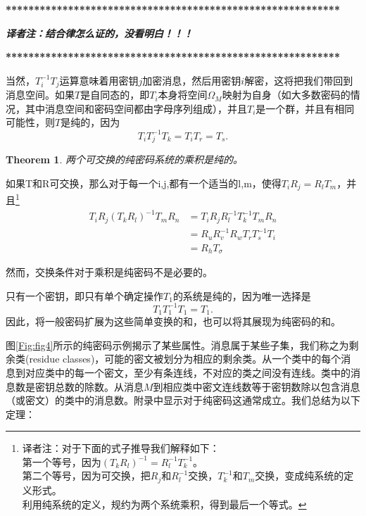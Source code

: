 \documentclass[]{article}
\newtheorem{theorem}{Theorem}
\begin{document}
\vspace{1cm}
\textbf{***********************************************************}\par
\textsl{\textbf{译者注：结合律怎么证的，没看明白！！！}}\par
\textbf{***********************************************************}\par
\vspace{1cm}

当然，$T^{-1}_iT_j$运算意味着用密钥$j$加密消息，然后用密钥$i$解密，这将把我们带回到消息空间。如果$T$是自同态的，即$T_i$本身将空间$\Omega_M$映射为自身（如大多数密码的情况，其中消息空间和密码空间都由字母序列组成），并且$T_i$是一个群，并且有相同可能性，则$T$是纯的，因为
\[T_iT^{-1}_jT_k=T_iT_r=T_s.\]

\begin{theorem}
	两个可交换的纯密码系统的乘积是纯的。
\end{theorem}

如果T和R可交换，那么对于每一个i,j,都有一个适当的l,m，使得$T_i R_j= R_l T_m$，并且\footnote{
	译者注：对于下面的式子推导我们解释如下：\\
	第一个等号，因为$(T_kR_l)^{-1}=R_l^{-1}T_k^{-1}$。\\
	第二个等号，因为可交换，把$R_j$和$R_l^{-1}$交换，$T_k^{-1}$和$T_m$交换，变成纯系统的定义形式。\\
	利用纯系统的定义，规约为两个系统乘积，得到最后一个等式。
}
\begin{equation}
	\begin{aligned}
		T_iR_j(T_kR_l)^{-1}T_mR_n &=T_i R_j R^{-1}_l T^{-1}_k T_m R_n \\
		                          &=R_u R^{-1}_vR_wT_rT^{-1}_sT_i\\
		                          &=R_hT_\sigma
	\end{aligned} 
\end{equation}

然而，交换条件对于乘积是纯密码不是必要的。


只有一个密钥，即只有单个确定操作$T_1$的系统是纯的，因为唯一选择是
\[T_1T^{-1}_1T_1=T_1.\]
因此，将一般密码扩展为这些简单变换的和，也可以将其展现为纯密码的和。

图\ref{Fig:fig4}所示的纯密码示例揭示了某些属性。消息属于某些子集，我们称之为剩余类(residue classes)，可能的密文被划分为相应的剩余类。从一个类中的每个消息到对应类中的每一个密文，至少有条连线，不对应的类之间没有连线。类中的消息数是密钥总数的除数。从消息$M$到相应类中密文连线数等于密钥数除以包含消息（或密文）的类中的消息数。附录中显示对于纯密码这通常成立。我们总结为以下定理：
\end{document}
